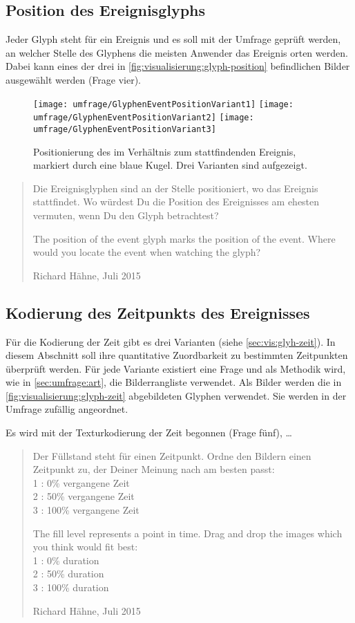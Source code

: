 \subsection*{Position des Ereignisglyphs}
Jeder Glyph steht für ein Ereignis und es soll mit der Umfrage geprüft werden, an welcher Stelle des Glyphens die meisten Anwender das Ereignis orten werden. Dabei kann eines der drei in \autoref{fig:visualisierung:glyph-position} befindlichen Bilder ausgewählt werden (Frage vier).

\begin{figure}
	\texttt{[image: umfrage/GlyphenEventPositionVariant1]}
	\hspace*{.1\textwidth}%
	\texttt{[image: umfrage/GlyphenEventPositionVariant2]}
	\hspace*{.1\textwidth}%
	\texttt{[image: umfrage/GlyphenEventPositionVariant3]}
	{\caption{Positionierung des  im Verhältnis zum stattfindenden Ereignis, markiert durch eine blaue Kugel. Drei Varianten sind aufgezeigt.}\label{fig:visualisierung:glyph-position}}
\end{figure}

\blockquote[Richard Hähne, Juli 2015]{
	Die Ereignisglyphen sind an der Stelle positioniert, wo das Ereignis stattfindet. Wo würdest Du die Position des Ereignisses am ehesten vermuten, wenn Du den Glyph betrachtest?
	
	The position of the event glyph marks the position of the event. Where would you locate the event when watching the glyph?
}

\subsection*{Kodierung des Zeitpunkts des Ereignisses}
Für die Kodierung der Zeit gibt es drei Varianten (siehe \autoref{sec:vis:glyh-zeit}). In diesem Abschnitt soll ihre quantitative Zuordbarkeit zu bestimmten Zeitpunkten überprüft werden. Für jede Variante existiert eine Frage und als Methodik wird, wie in \autoref{sec:umfrage:art}, die Bilderrangliste verwendet. Als Bilder werden die in \autoref{fig:visualisierung:glyph-zeit} abgebildeten Glyphen verwendet. Sie werden in der Umfrage zufällig angeordnet.

Es wird mit der Texturkodierung der Zeit begonnen (Frage fünf), \ldots
\blockquote[Richard Hähne, Juli 2015]{
Der Füllstand steht für einen Zeitpunkt. Ordne den Bildern einen Zeitpunkt zu, der Deiner Meinung nach am besten passt:\\
1 : 0\% vergangene Zeit\\
2 : 50\% vergangene Zeit\\
3 : 100\% vergangene Zeit

The fill level represents a point in time. Drag and drop the images which you think would fit best:\\
1 : 0\% duration\\
2 : 50\% duration\\
3 : 100\% duration

}


